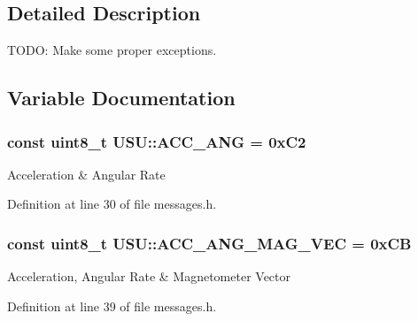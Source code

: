 \subsection{\-Detailed \-Description}
\-T\-O\-D\-O\-: \-Make some proper exceptions. 

\subsection{\-Variable \-Documentation}
\hypertarget{namespace_u_s_u_a0517f100ec98a93fb28d4ae52a943b19}{
\subsubsection[{\-A\-C\-C\-\_\-\-A\-N\-G}]{\setlength{\rightskip}{0pt plus 5cm}const uint8\-\_\-t {\bf \-U\-S\-U\-::\-A\-C\-C\-\_\-\-A\-N\-G} = 0x\-C2}}\label{namespace_u_s_u_a0517f100ec98a93fb28d4ae52a943b19}
\-Acceleration \& \-Angular \-Rate 

\-Definition at line 30 of file messages.\-h.

\hypertarget{namespace_u_s_u_ad03e7c0f41fd47a68a9f33abde73932a}{
\subsubsection[{\-A\-C\-C\-\_\-\-A\-N\-G\-\_\-\-M\-A\-G\-\_\-\-V\-E\-C}]{\setlength{\rightskip}{0pt plus 5cm}const uint8\-\_\-t {\bf \-U\-S\-U\-::\-A\-C\-C\-\_\-\-A\-N\-G\-\_\-\-M\-A\-G\-\_\-\-V\-E\-C} = 0x\-C\-B}}\label{namespace_u_s_u_ad03e7c0f41fd47a68a9f33abde73932a}
\-Acceleration, \-Angular \-Rate \& \-Magnetometer \-Vector 

\-Definition at line 39 of file messages.\-h.

